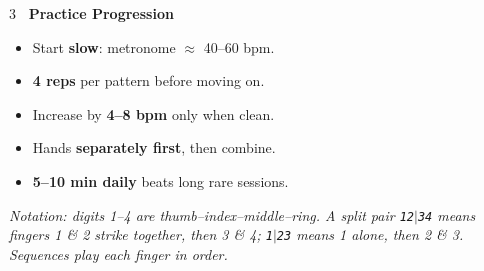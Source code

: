 \documentclass[letterpaper]{article}
\begin{document}
\begin{multicols}{3}
\colorbox{headerbg}{\color{white}\textbf{\ Practice Progression\ }}
\vspace{1mm}
\begin{itemize}
\item Start \textbf{slow}: metronome \(\approx\) 40--60 bpm.
\item \textbf{4 reps} per pattern before moving on.
\item Increase by \textbf{4--8 bpm} only when clean.
\item Hands \textbf{separately first}, then combine.
\item \textbf{5--10 min daily} beats long rare sessions.
\end{itemize}



\end{multicols}

\vspace{2mm}
{\fontsize{9}{11}\selectfont\centering
\textit{Notation: digits 1--4 are thumb--index--middle--ring. A split pair \texttt{12\(\vert\)34} means fingers 1 \& 2 strike together, then 3 \& 4; \texttt{1\(\vert\)23} means 1 alone, then 2 \& 3. Sequences play each finger in order.}
\par
}
\end{document}
